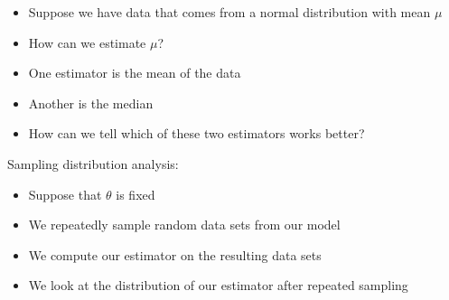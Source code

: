 \documentclass{beamer}
\begin{document}
\frame
{
  \begin{itemize}
    \item{Suppose we have data that comes from a normal distribution with mean $\mu$}
    \item{How can we estimate $\mu$?}
  \end{itemize}
}

\frame
{
  \begin{itemize}
    \item{One estimator is the mean of the data}
    \item{Another is the median}
  \end{itemize}
}

\frame
{
  \begin{itemize}
    \item{How can we tell which of these two estimators works better?}
  \end{itemize}
}

% 

\frame
{
  Sampling distribution analysis:
  \begin{itemize}
    \item{Suppose that $\theta$ is fixed}
    \item{We repeatedly sample random data sets from our model}
    \item{We compute our estimator on the resulting data sets}
    \item{We look at the distribution of our estimator after repeated sampling}
  \end{itemize}
}

\end{document}
